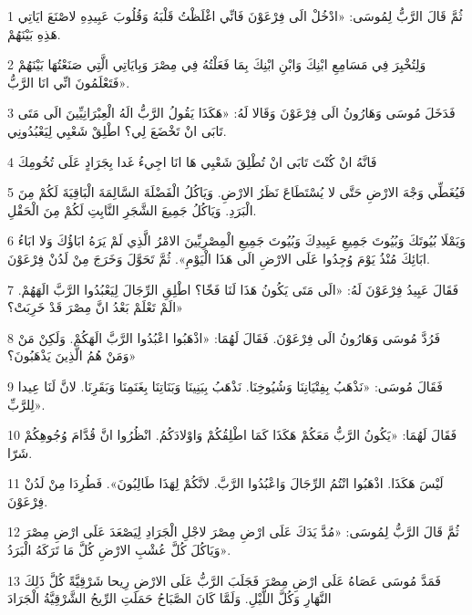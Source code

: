 \par 1 ثُمَّ قَالَ الرَّبُّ لِمُوسَى: «ادْخُلْ الَى فِرْعَوْنَ فَانِّي اغْلَظْتُ قَلْبَهُ وَقُلُوبَ عَبِيدِهِ لاصْنَعَ ايَاتِي هَذِهِ بَيْنَهُمْ.
\par 2 وَلِتُخْبِرَ فِي مَسَامِعِ ابْنِكَ وَابْنِ ابْنِكَ بِمَا فَعَلْتُهُ فِي مِصْرَ وَبِايَاتِي الَّتِي صَنَعْتُهَا بَيْنَهُمْ فَتَعْلَمُونَ انِّي انَا الرَّبُّ».
\par 3 فَدَخَلَ مُوسَى وَهَارُونُ الَى فِرْعَوْنَ وَقَالا لَهُ: «هَكَذَا يَقُولُ الرَّبُّ الَهُ الْعِبْرَانِيِّينَ الَى مَتَى تَابَى انْ تَخْضَعَ لِي؟ اطْلِقْ شَعْبِي لِيَعْبُدُونِي.
\par 4 فَانَّهُ انْ كُنْتَ تَابَى انْ تُطْلِقَ شَعْبِي هَا انَا اجِيءُ غَدا بِجَرَادٍ عَلَى تُخُومِكَ
\par 5 فَيُغَطِّي وَجْهَ الارْضِ حَتَّى لا يُسْتَطَاعَ نَظَرُ الارْضِ. وَيَاكُلُ الْفَضْلَةَ السَّالِمَةَ الْبَاقِيَةَ لَكُمْ مِنَ الْبَرَدِ. وَيَاكُلُ جَمِيعَ الشَّجَرِ النَّابِتِ لَكُمْ مِنَ الْحَقْلِ.
\par 6 وَيَمْلَا بُيُوتَكَ وَبُيُوتَ جَمِيعِ عَبِيدِكَ وَبُيُوتَ جَمِيعِ الْمِصْرِيِّينَ الامْرُ الَّذِي لَمْ يَرَهُ ابَاؤُكَ وَلا ابَاءُ ابَائِكَ مُنْذُ يَوْمَ وُجِدُوا عَلَى الارْضِ الَى هَذَا الْيَوْمِ». ثُمَّ تَحَوَّلَ وَخَرَجَ مِنْ لَدُنْ فِرْعَوْنَ.
\par 7 فَقَالَ عَبِيدُ فِرْعَوْنَ لَهُ: «الَى مَتَى يَكُونُ هَذَا لَنَا فَخّا؟ اطْلِقِ الرِّجَالَ لِيَعْبُدُوا الرَّبَّ الَهَهُمْ. الَمْ تَعْلَمْ بَعْدُ انَّ مِصْرَ قَدْ خَرِبَتْ؟»
\par 8 فَرُدَّ مُوسَى وَهَارُونُ الَى فِرْعَوْنَ. فَقَالَ لَهُمَا: «اذْهَبُوا اعْبُدُوا الرَّبَّ الَهَكُمْ. وَلَكِنْ مَنْ وَمَنْ هُمُ الَّذِينَ يَذْهَبُونَ؟»
\par 9 فَقَالَ مُوسَى: «نَذْهَبُ بِفِتْيَانِنَا وَشُيُوخِنَا. نَذْهَبُ بِبَنِينَا وَبَنَاتِنَا بِغَنَمِنَا وَبَقَرِنَا. لانَّ لَنَا عِيدا لِلرَّبِّ».
\par 10 فَقَالَ لَهُمَا: «يَكُونُ الرَّبُّ مَعَكُمْ هَكَذَا كَمَا اطْلِقُكُمْ وَاوْلادَكُمُ. انْظُرُوا انَّ قُدَّامَ وُجُوهِكُمْ شَرّا.
\par 11 لَيْسَ هَكَذَا. اذْهَبُوا انْتُمُ الرِّجَالَ وَاعْبُدُوا الرَّبَّ. لانَّكُمْ لِهَذَا طَالِبُونَ». فَطُرِدَا مِنْ لَدُنْ فِرْعَوْنَ.
\par 12 ثُمَّ قَالَ الرَّبُّ لِمُوسَى: «مُدَّ يَدَكَ عَلَى ارْضِ مِصْرَ لاجْلِ الْجَرَادِ لِيَصْعَدَ عَلَى ارْضِ مِصْرَ وَيَاكُلَ كُلَّ عُشْبِ الارْضِ كُلَّ مَا تَرَكَهُ الْبَرَدُ».
\par 13 فَمَدَّ مُوسَى عَصَاهُ عَلَى ارْضِ مِصْرَ فَجَلَبَ الرَّبُّ عَلَى الارْضِ رِيحا شَرْقِيَّةً كُلَّ ذَلِكَ النَّهَارِ وَكُلَّ اللَّيْلِ. وَلَمَّا كَانَ الصَّبَاحُ حَمَلَتِ الرِّيحُ الشَّرْقِيَّةُ الْجَرَادَ
